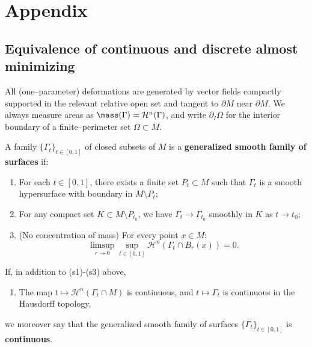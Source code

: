 \chapter{Appendix}\label{ch:interpolation-lemma}\label{appendix:AM}
\section{Equivalence of continuous and discrete almost minimizing }
All (one–parameter) deformations are generated by vector fields compactly supported in the relevant
relative open set and tangent to $\partial M$ near $\partial M$. We always measure areas as
$\mass(\Gamma)=\mathcal{H}^n(\Gamma)$, and write $\partial_I\Omega$ for the interior boundary of a
finite–perimeter set $\Omega\subset M$.

\begin{definition}\label{def:family-of-surfaces}
A family $\{\Gamma_t\}_{t \in [0, 1]}$ of closed subsets of $M$ is a \textbf{generalized smooth family of surfaces} if:
\begin{enumerate}
    \item[(s1)] For each $t \in [0, 1]$, there exists a finite set $P_t \subset M$ such that $\Gamma_t$ is a smooth hypersurface with boundary in $M \setminus P_t$;

    \item[(s2)] For any compact set $K \subset M \setminus P_{t_0}$, we have $\Gamma_t \to \Gamma_{t_0}$ smoothly in $K$ as $t \to t_0$;

    \item[(s3)] (No concentration of mass) For every point $x \in M$:
    \begin{equation*}
        \limsup_{r \to 0}\sup_{t \in [0, 1]}\mathcal{H}^n(\Gamma_t\cap B_r(x)) = 0.
    \end{equation*}
\end{enumerate}
If, in addition to (s1)-(s3) above,
\begin{enumerate}
    \item [(s4)] The map $t \mapsto \mathcal{H}^n(\Gamma_t\cap M)$ is continuous, and $t \mapsto \Gamma_t$ is continuous in the Hausdorff topology,
\end{enumerate}
we moreover say that the generalized smooth family of surfaces $\{\Gamma_t\}_{t \in [0, 1]}$ is \textbf{continuous}.
\end{definition}

